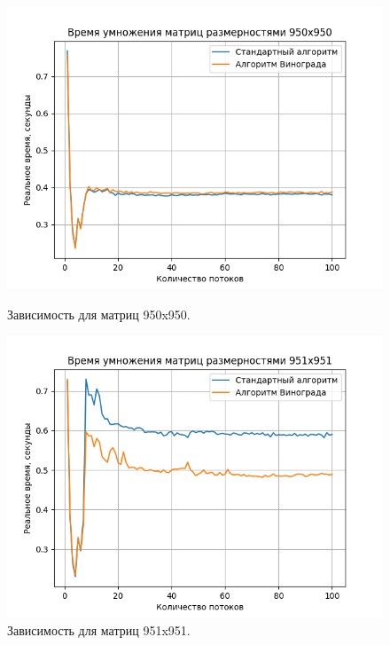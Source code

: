 \documentclass[a4paper,12pt]{article}
\begin{document}
\begin{figure}[H]
\begin{center}
\begin{minipage}[H]{0.48\linewidth}
\includegraphics[width=1\linewidth]{950x950.png}
\caption{Зависимость для матриц 950x950.}
\label{ris:experimoriginal}
\end{minipage}
\hfill
\begin{minipage}[H]{0.48\linewidth}
\includegraphics[width=1\linewidth]{951x951.png}
\caption{Зависимость для матриц 951x951.}
\label{ris:experimcoded}
\end{minipage}
\end{center}
\end{figure}
\end{document}
